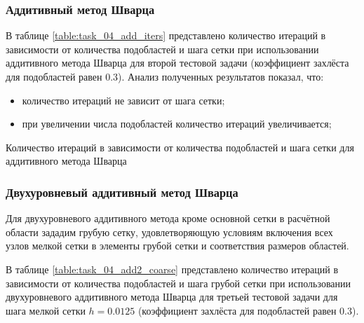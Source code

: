 \documentclass[a4paper]{article}
\begin{document}
\subsubsection{Аддитивный метод Шварца}

В таблице \ref{table:task_04_add_iters} представлено количество итераций в зависимости от количества подобластей и шага сетки при использовании аддитивного метода Шварца для второй тестовой задачи (коэффициент захлёста для подобластей равен 0.3). Анализ полученных результатов показал, что:
\begin{itemize}
\item количество итераций не зависит от шага сетки;
\item при увеличении числа подобластей количество итераций увеличивается;
\end{itemize}

\begin{table}[h]
\caption{Количество итераций в зависимости от количества подобластей и шага сетки для аддитивного метода Шварца}
\label{table:task_04_add_iters}
\end{table}

\newpage

\subsubsection{Двухуровневый аддитивный метод Шварца}

Для двухуровневого аддитивного метода кроме основной сетки в расчётной области зададим грубую сетку, удовлетворяющую условиям включения всех узлов мелкой сетки в элементы грубой сетки и соответствия размеров областей. 

В таблице \ref{table:task_04_add2_coarse} представлено количество итераций в зависимости от количества подобластей и шага грубой сетки при использовании двухуровневого аддитивного метода Шварца для третьей тестовой задачи для шага мелкой сетки $h = 0.0125$ (коэффициент захлёста для подобластей равен 0.3).
\end{document}
